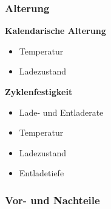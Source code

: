 \subsubsection{Alterung}


\begin{minipage}[t]{0.48\columnwidth}
\textbf{Kalendarische Alterung}
  \begin{itemize}
    \item Temperatur
    \item Ladezustand
  \end{itemize}
\end{minipage}
\hfill
\begin{minipage}[t]{0.48\columnwidth}
\textbf{Zyklenfestigkeit}
  \begin{itemize}
    \item Lade- und Entladerate
    \item Temperatur
    \item Ladezustand
    \item Entladetiefe
  \end{itemize}
\end{minipage}



\subsubsection{Vor- und Nachteile}

